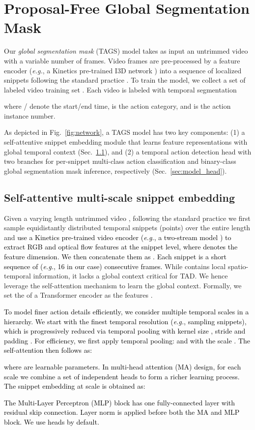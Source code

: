 \documentclass[runningheads]{llncs}
\newcommand{\eg}{\textit{e.g.}}
\newcommand{\shortmodelname}{TAGS}
\begin{document}
\section{Proposal-Free Global Segmentation Mask}
\label{sec:method}
Our {\em global segmentation mask} ({\shortmodelname}) model
takes as input an untrimmed video
 with a variable number of frames.
Video frames are pre-processed by a feature encoder 
(\eg, a Kinetics pre-trained I3D network \cite{carreira2017quo})
into a sequence of localized snippets following the standard practice \cite{lin2019bmn}.
To train the model, we collect a set of labeled 
video training set . Each video  is labeled with temporal segmentation 

where / denote 
the start/end time,  is the action category,
and  is the action instance number. 

As depicted in Fig.~\ref{fig:network}, a {\shortmodelname} model
has two key components:
(1) a self-attentive snippet embedding module
that learns feature representations with global temporal context (Sec.~\ref{sec:model_embedding}),
and
(2) a temporal action detection head with two branches
for per-snippet multi-class action classification 
and binary-class global segmentation mask inference, respectively
 (Sec.~\ref{sec:model_head}).
 
\subsection{Self-attentive multi-scale snippet embedding}
\label{sec:model_embedding}
Given a varying length untrimmed video ,
following the standard practice \cite{xu2020g,lin2019bmn} we first sample  equidistantly distributed temporal snippets (points) over the entire length and \textcolor{black}{use a Kinetics pre-trained video encoder 
(\eg, a two-stream model \cite{wang2016temporal}) to extract 
RGB  and optical flow features  at the snippet level, where  denotes the feature dimension. 
We then concatenate them as .
Each snippet is a short sequence of (\eg, 16 in our case) consecutive frames.}
While  contains local spatio-temporal information, 
it lacks a global context critical for TAD.
We hence leverage the self-attention mechanism \cite{vaswani2017attention} to learn the global context. 
Formally, we set the  of a Transformer encoder
as the features .
\textcolor{black}{
To model finer action details efficiently,
we consider multiple temporal scales in a hierarchy.
We start with the finest temporal resolution \textcolor{black}{(\eg, sampling  snippets)},
which is progressively reduced via temporal pooling 
with kernel size , stride  and padding .
For efficiency, we first apply temporal pooling:
 and  with 
the scale .
The self-attention then follows as:

where  are learnable parameters. In multi-head attention (MA) design, for each scale  we combine a set of  independent heads  to form a richer learning process. The snippet embedding  at scale  is obtained as:

The {Multi-Layer Perceptron} (MLP) block has one fully-connected layer with residual skip connection. Layer norm is applied before both the MA and MLP block. 
We use  heads by default.
}
\end{document}
